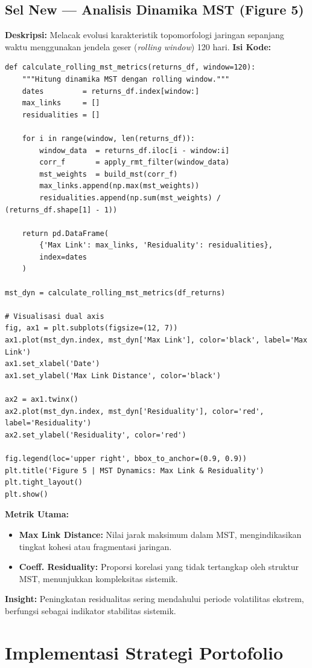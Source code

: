 \documentclass[12pt, a4paper]{article}
\begin{document}
\subsection{Sel New — Analisis Dinamika MST (Figure 5)}
\textbf{Deskripsi:} Melacak evolusi karakteristik topomorfologi jaringan sepanjang waktu menggunakan jendela geser (\textit{rolling window}) 120 hari.
\textbf{Isi Kode:}
\begin{lstlisting}
def calculate_rolling_mst_metrics(returns_df, window=120):
    """Hitung dinamika MST dengan rolling window."""
    dates         = returns_df.index[window:]
    max_links     = []
    residualities = []

    for i in range(window, len(returns_df)):
        window_data  = returns_df.iloc[i - window:i]
        corr_f       = apply_rmt_filter(window_data)
        mst_weights  = build_mst(corr_f)
        max_links.append(np.max(mst_weights))
        residualities.append(np.sum(mst_weights) / (returns_df.shape[1] - 1))

    return pd.DataFrame(
        {'Max Link': max_links, 'Residuality': residualities},
        index=dates
    )

mst_dyn = calculate_rolling_mst_metrics(df_returns)

# Visualisasi dual axis
fig, ax1 = plt.subplots(figsize=(12, 7))
ax1.plot(mst_dyn.index, mst_dyn['Max Link'], color='black', label='Max Link')
ax1.set_xlabel('Date')
ax1.set_ylabel('Max Link Distance', color='black')

ax2 = ax1.twinx()
ax2.plot(mst_dyn.index, mst_dyn['Residuality'], color='red', label='Residuality')
ax2.set_ylabel('Residuality', color='red')

fig.legend(loc='upper right', bbox_to_anchor=(0.9, 0.9))
plt.title('Figure 5 | MST Dynamics: Max Link & Residuality')
plt.tight_layout()
plt.show()
\end{lstlisting}
\textbf{Metrik Utama:}
\begin{itemize}
    \item \textbf{Max Link Distance:} Nilai jarak maksimum dalam MST, mengindikasikan tingkat kohesi atau fragmentasi jaringan.
    \item \textbf{Coeff. Residuality:} Proporsi korelasi yang tidak tertangkap oleh struktur MST, menunjukkan kompleksitas sistemik.
\end{itemize}
\textbf{Insight:} Peningkatan residualitas sering mendahului periode volatilitas ekstrem, berfungsi sebagai indikator stabilitas sistemik.

\section{Implementasi Strategi Portofolio}
\end{document}

